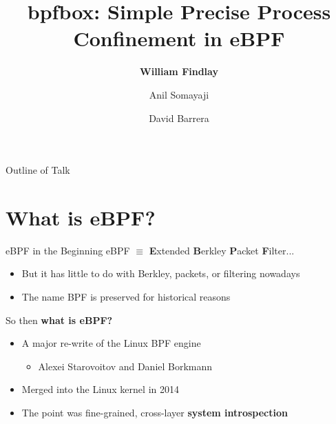 \documentclass[12pt, dvipsnames]{beamer}
\title{bpfbox: Simple Precise Process Confinement in eBPF}
\author{\textbf{William Findlay} \and Anil Somayaji \and David Barrera}
\institute{Carleton University\\\href{mailto:will@ccsl.carleton.ca}{\ttfamily will@ccsl.carleton.ca}}
\begin{document}

\begin{frame}
\titlepage
\end{frame}

\setwatermark[hoffset=6cm, voffset=0.3cm]{}

\begin{frame}{Outline of Talk}
    \tableofcontents
\end{frame}

\section{What is eBPF?}

\begin{frame}[c]{eBPF in the Beginning}
eBPF $\equiv$ \textbf{E}xtended \textbf{B}erkley \textbf{P}acket \textbf{F}ilter...
\begin{itemize}
    \item But it has little to do with Berkley, packets, or filtering nowadays
    \item The name BPF is preserved for historical reasons
\end{itemize}
\vfill
So then \textbf{what is eBPF?}
\begin{itemize}
    \item A major re-write of the Linux BPF engine
    \begin{itemize}
        \item Alexei Starovoitov and Daniel Borkmann
    \end{itemize}
    \item Merged into the Linux kernel in 2014
    \item The point was fine-grained, cross-layer \textbf{system introspection}
\end{itemize}
\end{frame}
\end{document}
